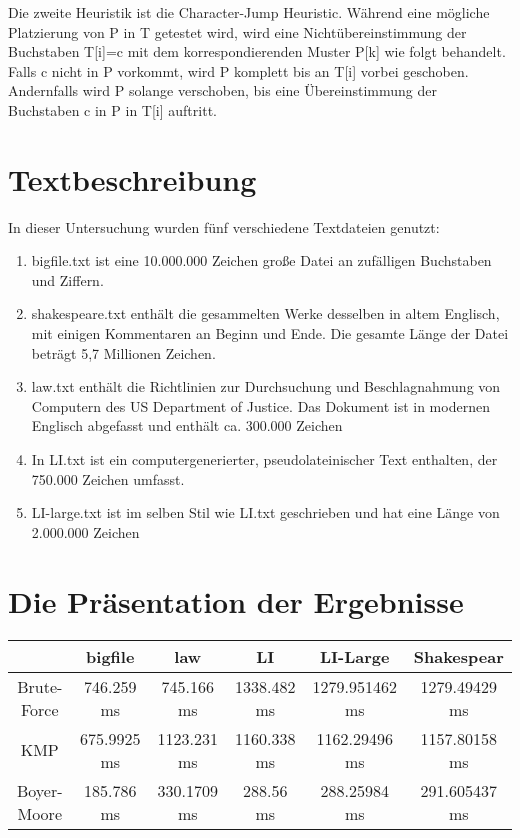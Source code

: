 \documentclass[14pt]{article}
\begin{document}
Die zweite Heuristik ist die Character-Jump Heuristic. Während eine mögliche Platzierung von P in T getestet wird, wird eine Nichtübereinstimmung der Buchstaben T[i]=c  mit dem korrespondierenden Muster P[k] wie folgt behandelt. Falls c nicht in P vorkommt, wird P komplett bis an T[i] vorbei geschoben. Andernfalls wird P solange verschoben, bis eine Übereinstimmung der Buchstaben c in P in T[i] auftritt.\\




\section{Textbeschreibung}
In dieser Untersuchung wurden fünf verschiedene Textdateien genutzt:\\

\begin{enumerate}
\item bigfile.txt ist eine 10.000.000 Zeichen große Datei an zufälligen Buchstaben und Ziffern.

\item shakespeare.txt enthält die gesammelten Werke desselben in altem Englisch, mit einigen Kommentaren an
 Beginn und Ende. Die gesamte Länge der Datei beträgt 5,7 Millionen Zeichen.
\item law.txt enthält die Richtlinien zur Durchsuchung und Beschlagnahmung von Computern des US Department of Justice. Das Dokument ist in modernen Englisch abgefasst und enthält ca. 300.000 Zeichen
\item In LI.txt ist ein computergenerierter,
 pseudolateinischer Text enthalten, der 750.000 Zeichen umfasst.
\item LI-large.txt ist im selben Stil wie LI.txt geschrieben und hat eine Länge von 2.000.000 Zeichen
\end{enumerate}

\section{Die Präsentation der Ergebnisse}
\begin{center}
\begin{tabular}{ |c|c|c|c|c|c| } 
 \hline
  & bigfile & law & LI & LI-Large & Shakespear \\
 \hline 
 Brute-Force & 746.259 ms & 745.166 ms & 1338.482 ms& 1279.951462 ms & 1279.49429 ms\\ 
 \hline
 KMP & 675.9925 ms & 1123.231 ms & 1160.338 ms & 1162.29496 ms & 1157.80158 ms\\ 
 \hline
 Boyer-Moore & 185.786 ms & 330.1709 ms & 288.56 ms & 288.25984 ms & 291.605437 ms\\ 
 \hline
\end{tabular}
\end{center}
\end{document}
